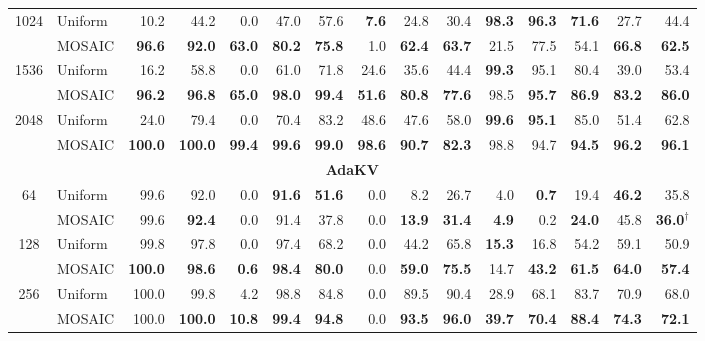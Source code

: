 \begin{table}[tp]
\begin{tabular}{@{} c l rrrrrrrrrrrrr @{}}
    \cmidrule(l){1-15}
    \multirow{2}{*}{1024} & Uniform & 10.2 & 44.2 & 0.0 & 47.0 & 57.6 & \textbf{7.6} & 24.8 & 30.4 & \textbf{98.3} & \textbf{96.3} & \textbf{71.6} & 27.7 & 44.4 \\
     & MOSAIC & \textbf{96.6} & \textbf{92.0} & \textbf{63.0} & \textbf{80.2} & \textbf{75.8} & 1.0 & \textbf{62.4} & \textbf{63.7} & 21.5 & 77.5 & 54.1 & \textbf{66.8} & \textbf{62.5} \\
    \cmidrule(l){1-15}
    \multirow{2}{*}{1536} & Uniform & 16.2 & 58.8 & 0.0 & 61.0 & 71.8 & 24.6 & 35.6 & 44.4 & \textbf{99.3} & 95.1 & 80.4 & 39.0 & 53.4 \\
     & MOSAIC & \textbf{96.2} & \textbf{96.8} & \textbf{65.0} & \textbf{98.0} & \textbf{99.4} & \textbf{51.6} & \textbf{80.8} & \textbf{77.6} & 98.5 & \textbf{95.7} & \textbf{86.9} & \textbf{83.2} & \textbf{86.0} \\
    \cmidrule(l){1-15}
    \multirow{2}{*}{2048} & Uniform & 24.0 & 79.4 & 0.0 & 70.4 & 83.2 & 48.6 & 47.6 & 58.0 & \textbf{99.6} & \textbf{95.1} & 85.0 & 51.4 & 62.8 \\
     & MOSAIC & \textbf{100.0} & \textbf{100.0} & \textbf{99.4} & \textbf{99.6} & \textbf{99.0} & \textbf{98.6} & \textbf{90.7} & \textbf{82.3} & 98.8 & 94.7 & \textbf{94.5} & \textbf{96.2} & \textbf{96.1} \\
    \midrule
    \multicolumn{15}{c}{\textbf{AdaKV}} \\
    \midrule
    \multirow{2}{*}{64} & Uniform & 99.6 & 92.0 & 0.0 & \textbf{91.6} & \textbf{51.6} & 0.0 & 8.2 & 26.7 & 4.0 & \textbf{0.7} & 19.4 & \textbf{46.2} & 35.8 \\
     & MOSAIC & 99.6 & \textbf{92.4} & 0.0 & 91.4 & 37.8 & 0.0 & \textbf{13.9} & \textbf{31.4} & \textbf{4.9} & 0.2 & \textbf{24.0} & 45.8 & \textbf{36.0}$^\dagger$ \\
    \cmidrule(l){1-15}
    \multirow{2}{*}{128} & Uniform & 99.8 & 97.8 & 0.0 & 97.4 & 68.2 & 0.0 & 44.2 & 65.8 & \textbf{15.3} & 16.8 & 54.2 & 59.1 & 50.9 \\
     & MOSAIC & \textbf{100.0} & \textbf{98.6} & \textbf{0.6} & \textbf{98.4} & \textbf{80.0} & 0.0 & \textbf{59.0} & \textbf{75.5} & 14.7 & \textbf{43.2} & \textbf{61.5} & \textbf{64.0} & \textbf{57.4} \\
    \cmidrule(l){1-15}
    \multirow{2}{*}{256} & Uniform & 100.0 & 99.8 & 4.2 & 98.8 & 84.8 & 0.0 & 89.5 & 90.4 & 28.9 & 68.1 & 83.7 & 70.9 & 68.0 \\
     & MOSAIC & 100.0 & \textbf{100.0} & \textbf{10.8} & \textbf{99.4} & \textbf{94.8} & 0.0 & \textbf{93.5} & \textbf{96.0} & \textbf{39.7} & \textbf{70.4} & \textbf{88.4} & \textbf{74.3} & \textbf{72.1} \\

\end{tabular}
\end{table}
